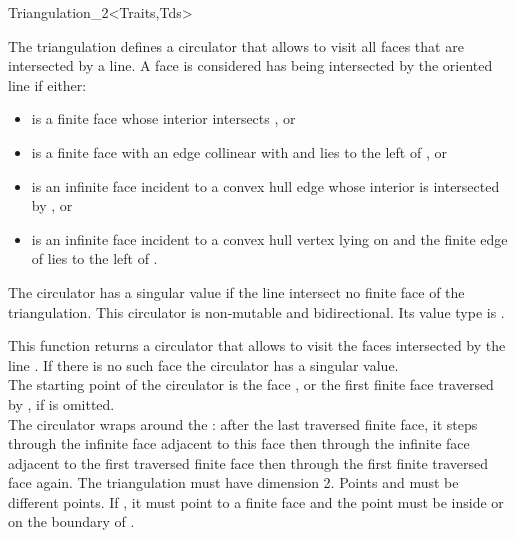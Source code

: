 \begin{ccRefClass}{Triangulation_2<Traits,Tds>}
\ccGlue
{}

\ccGlue
{}


The triangulation defines a circulator that allows
to visit all faces that are intersected by a line. 
A  face   is 
considered has being intersected by 
 the oriented line  if either:
\begin{itemize}\ccTexHtml{\itemsep0pt}{}
\item 
{} is a finite face whose interior intersects , or
\item
  is a finite face with  an edge collinear with  and lies
to the left of , or
\item
{} is an infinite face incident to a  convex hull edge 
whose interior is intersected
by , or
\item
{} is an infinite face incident to a  convex hull vertex
lying on   and the finite edge of 
lies to the left of . 
\end{itemize}
The circulator has a singular value if  the line 
intersect no finite face of the triangulation.
This circulator is
non-mutable and bidirectional. Its value type is .

{ This function returns a circulator that allows to visit the 
 faces intersected by the line . 
If there is no such face the circulator has a singular value.\\
 The starting point of the circulator is the face , or
 the first finite face traversed by  , if
  is omitted. \\
  The circulator wraps around the  :
after the last traversed finite face, it steps through the infinite face adjacent
to this face then through the infinite face adjacent to the first
traversed finite face then through the first finite traversed face
again.
\ccPrecond The triangulation must have dimension 2.
\ccPrecond Points  and  must be different points.
\ccPrecond If , it must point to a finite face
 and the point  must be
inside or on the boundary of .}


\end{ccRefClass}
